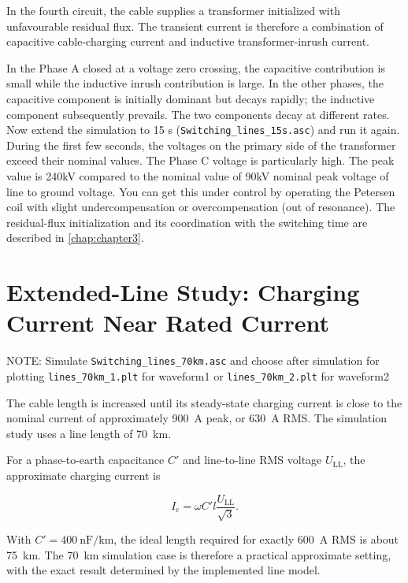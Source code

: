 In the fourth circuit, the cable supplies a transformer initialized with
unfavourable residual flux. The transient current is therefore a combination
of capacitive cable-charging current and inductive transformer-inrush current.

In the Phase A closed at a voltage zero crossing, the capacitive contribution is
small while the inductive inrush contribution is large. In the other phases,
the capacitive component is initially dominant but decays rapidly; the
inductive component subsequently prevails. The two components decay at
different rates. Now extend the simulation to 15 s (\texttt{Switching\_lines\_15s.asc}) and run it again. During the first few seconds, the voltages on the primary side of the transformer exceed their nominal values. The Phase C voltage is particularly high. The peak value is 240kV compared to the nominal value of 90kV nominal peak voltage of line to ground voltage.
You can get this under control by operating the Petersen coil with slight undercompensation or overcompensation
(out of resonance). The residual-flux initialization and its coordination with the switching time are
described in \cref{chap:chapter3}.

\section{Extended-Line Study: Charging Current Near Rated Current}
\label{sec:section47}
\noindent NOTE: Simulate \texttt{Switching\_lines\_70km.asc} and choose after simulation for plotting \texttt{lines\_70km\_1.plt} for waveform1 or \texttt{lines\_70km\_2.plt} for waveform2

The cable length is increased until its steady-state charging current is close
to the nominal current of approximately \SI{900}{\ampere} peak, or
\SI{630}{\ampere} RMS. The simulation study uses a line length of
\SI{70}{\kilo\metre}.

For a phase-to-earth capacitance $C'$ and line-to-line RMS voltage
$U_{\mathrm{LL}}$, the approximate charging current is

\begin{equation}
I_{\mathrm c}=\omega C'l\frac{U_{\mathrm{LL}}}{\sqrt{3}}.
\label{eq:cable-charging-current}
\end{equation}

With $C'=\SI{400}{\nano\farad\per\kilo\metre}$, the ideal length required for
exactly \SI{600}{\ampere} RMS is about \SI{75}{\kilo\metre}. The
\SI{70}{\kilo\metre} simulation case is therefore a practical approximate
setting, with the exact result determined by the implemented line model.


